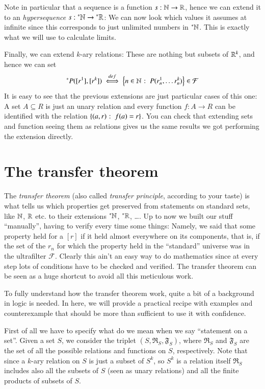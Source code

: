\documentclass[adraft, copyright,creativecommons,sharealike,noncommercial]{Preambles/eptcs}
\newcommand{\nstar}{{^*}}
\begin{document}
Note in particular that a sequence is a function $s:\mathbb{N} \to \mathbb{R}$, hence we can extend it to an \emph{hypersequence} $s:\nstar \naturals \to \nstar  \reals$: We can now look which values it assumes at infinite since this corresponds to just unlimited numbers in $\nstar\naturals$. This is exactly what we will use to calculate limits.

Finally, we can extend $k$-ary relations: These are nothing but subsets of $\mathbb{R}^k$, and hence we can set
\begin{equation*}
	\nstar P([r^1], [r^k]) \iffdef \suchthat{n \in \naturals}{P(r^1_n, \dots r^k_n)} \in \mathcal{F}
\end{equation*}
It is easy to see that the previous extensions are just particular cases of this one: A set $A \subseteq R$ is just an unary relation and every function $f:A \to R$ can be identified with the relation
$\left\{(a,r) \: \colon \: f(a) = r\right\}$. You can check that extending sets and function seeing them as relations gives us the same results we got performing the extension directly.
%
%
\section{The transfer theorem}
%
The \emph{transfer theorem} (also called \emph{transfer principle}, according to your taste) is what tells us which properties get preserved from statements on standard sets, like $\mathbb{N}$, $\mathbb{R}$ etc. to their extensions $\nstar\naturals$, $\nstar \reals$, \dots. Up to now we built our stuff ``manually'', having to verify every time some things: Namely, we said that some property held for a $[r]$ if it held almost everywhere on its components, that is, if the set of the $r_n$ for which the property held in the ``standard'' universe was in the ultrafilter $\mathcal{F}$. Clearly this ain't an easy way to do mathematics since at every step lots of conditions have to be checked and verified. The transfer theorem can be seen as a huge shortcut to avoid all this meticulous work.

To fully understand how the transfer theorem work, quite a bit of a background in logic is needed. In here, we will provide a practical recipe with examples and counterexample that should be more than sufficient to use it with confidence.

First of all we have to specify what do we mean when we say ``statement on a set''. 
Given a set $S$, we consider the triplet $(S,\mathfrak{R}_S, \mathfrak{F}_S)$, where $\mathfrak{R}_S$ and $\mathfrak{F}_S$ are the set of all the possible relations and functions on $S$, respectively. Note that since a $k$-ary relation on $S$ is just a subset of $S^k$, so $S^k$ is a relation itself $\mathfrak{R}_S$ includes also all the subsets of $S$ (seen as unary relations) and all the finite products of subsets of $S$.
\end{document}
